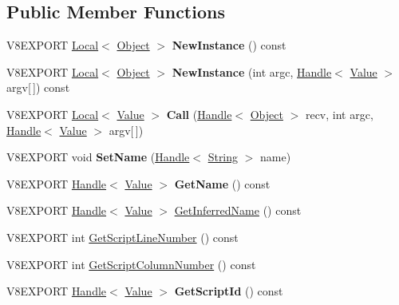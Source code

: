 \subsection*{Public Member Functions}
\begin{DoxyCompactItemize}
\item 
\hypertarget{classv8_1_1_function_a7461d71d7a0bf6e510d16200a7c64501}{}V8\+E\+X\+P\+O\+R\+T \hyperlink{classv8_1_1_local}{Local}$<$ \hyperlink{classv8_1_1_object}{Object} $>$ {\bfseries New\+Instance} () const \label{classv8_1_1_function_a7461d71d7a0bf6e510d16200a7c64501}

\item 
\hypertarget{classv8_1_1_function_a8a154fe47d441ae9baaf4e76b2efeadc}{}V8\+E\+X\+P\+O\+R\+T \hyperlink{classv8_1_1_local}{Local}$<$ \hyperlink{classv8_1_1_object}{Object} $>$ {\bfseries New\+Instance} (int argc, \hyperlink{classv8_1_1_handle}{Handle}$<$ \hyperlink{classv8_1_1_value}{Value} $>$ argv\mbox{[}$\,$\mbox{]}) const \label{classv8_1_1_function_a8a154fe47d441ae9baaf4e76b2efeadc}

\item 
\hypertarget{classv8_1_1_function_ac61877494d2d8bb81fcef96003ec4059}{}V8\+E\+X\+P\+O\+R\+T \hyperlink{classv8_1_1_local}{Local}$<$ \hyperlink{classv8_1_1_value}{Value} $>$ {\bfseries Call} (\hyperlink{classv8_1_1_handle}{Handle}$<$ \hyperlink{classv8_1_1_object}{Object} $>$ recv, int argc, \hyperlink{classv8_1_1_handle}{Handle}$<$ \hyperlink{classv8_1_1_value}{Value} $>$ argv\mbox{[}$\,$\mbox{]})\label{classv8_1_1_function_ac61877494d2d8bb81fcef96003ec4059}

\item 
\hypertarget{classv8_1_1_function_ab7abce9df66a4b02f8297c0ab0d5e090}{}V8\+E\+X\+P\+O\+R\+T void {\bfseries Set\+Name} (\hyperlink{classv8_1_1_handle}{Handle}$<$ \hyperlink{classv8_1_1_string}{String} $>$ name)\label{classv8_1_1_function_ab7abce9df66a4b02f8297c0ab0d5e090}

\item 
\hypertarget{classv8_1_1_function_ac8b07c4d3e6079ac8a7fb17c1784f456}{}V8\+E\+X\+P\+O\+R\+T \hyperlink{classv8_1_1_handle}{Handle}$<$ \hyperlink{classv8_1_1_value}{Value} $>$ {\bfseries Get\+Name} () const \label{classv8_1_1_function_ac8b07c4d3e6079ac8a7fb17c1784f456}

\item 
V8\+E\+X\+P\+O\+R\+T \hyperlink{classv8_1_1_handle}{Handle}$<$ \hyperlink{classv8_1_1_value}{Value} $>$ \hyperlink{classv8_1_1_function_a2eff94c159ec39792bf3ec52c81e045c}{Get\+Inferred\+Name} () const 
\item 
V8\+E\+X\+P\+O\+R\+T int \hyperlink{classv8_1_1_function_a3ae29205851ecbf99ab8ba03559fb849}{Get\+Script\+Line\+Number} () const 
\item 
V8\+E\+X\+P\+O\+R\+T int \hyperlink{classv8_1_1_function_a81c14d8ec5996630ef56c524b19084c2}{Get\+Script\+Column\+Number} () const 
\item 
\hypertarget{classv8_1_1_function_ae2fd80461eebc1896df8b608e90b9236}{}V8\+E\+X\+P\+O\+R\+T \hyperlink{classv8_1_1_handle}{Handle}$<$ \hyperlink{classv8_1_1_value}{Value} $>$ {\bfseries Get\+Script\+Id} () const \label{classv8_1_1_function_ae2fd80461eebc1896df8b608e90b9236}


\end{DoxyCompactItemize}
